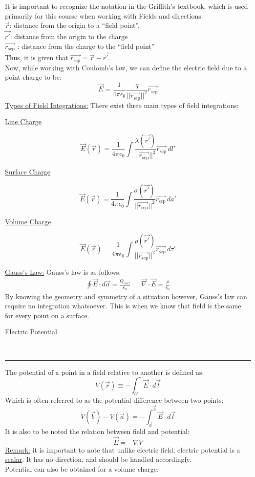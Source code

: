 \documentclass{article}
\newcommand{\sepvec}{\vec{r_\textrm{sep}}}
\newcommand{\header}[1]{\begin{large}\noindent #1\end{large}\\\rule{\textwidth}{0.5pt}}
\newcommand{\gap}{\medskip\\}
\newcommand{\centertext}[1]{\begin{center}#1\end{center}}
\newcommand{\sheader}[1]{\underline{#1:}}
\newcommand{\sgap}{\smallskip\\}
\begin{document}
It is important to recognize the notation in the Griffith's textbook, which is used
primarily for this course when working with Fields and directions:
\sgap
$\vec{r}$: distance from the origin to a ``field point''.\\
$\vec{r'}$: distance from the origin to the charge\\
$\sepvec$ : distance from the charge to the ``field point''\\
Thus, it is given that $\sepvec = \vec{r} - \vec{r'}$.
\gap
Now, while working with Coulomb's law, we can define the electric field due to a point charge to be:
\[
    \vec{E} = \frac{1}{4\pi \epsilon_0} \frac{q}{||\sepvec||^2}\sepvec    
\]
\sheader{Types of Field Integrations} There exist three main types of field integrations:
\begin{multicols}{3}
    \centertext{\underline{Line Charge}}
    \[
        \vec{E}(\vec{r}) = \frac{1}{4 \pi \epsilon_0}\int{\frac{\lambda(\vec{r'})}{||\sepvec||^2}\sepvec \, dl'}    
    \]
    \vfill\null\columnbreak
    \centertext{\underline{Surface Charge}}
    \[
        \vec{E}(\vec{r}) = \frac{1}{4\pi\epsilon_0}\int{\frac{\sigma(\vec{r'})}{||\sepvec||^2}\sepvec \, da'}    
    \]
    \vfill\null\columnbreak
    \centertext{\underline{Volume Charge}}
    \[
        \vec{E}(\vec{r}) = \frac{1}{4\pi\epsilon_0}\int{\frac{\rho(\vec{r'})}{||\sepvec||^2}\sepvec \, d\tau'}    
    \]
    \vfill\null
\end{multicols}
\sheader{Gauss's Law} Gauss's law is as follows:
\begin{align*}
    \oint{\vec{E} \cdot d\vec{a}} = \frac{Q_\textrm{encl}}{\epsilon_0} && \vec{\nabla} \cdot \vec{E} = \frac{\rho}{\epsilon_0}
\end{align*}
By knowing the geometry and symmetry of a situation however, Gauss's law can require
no integration whatsoever. This is when we know that field is the same for every point
on a surface. 
\gap
\header{Electric Potential}
The potential of a point in a field relative to another is defined as:
\[
    V(\vec{r}) \equiv - \int_{\mathcal{O}}^r \vec{E} \cdot d\vec{l}    
\]
Which is often referred to as the potential difference between two points:
\[
    V(\vec{b}) - V(\vec{a}) = - \int_{\vec{a}}^{\vec{b}}{\vec{E} \cdot d\vec{l}}
\]
It is also to be noted the relation between field and potential:
\[
    \vec{E} = - \nabla V    
\]
\sheader{Remark} it is important to note that unlike electric field, electric potential
is a \underline{scalar}. It has no direction, and should be handled accordingly.
\gap
Potential can also be obtained for a volume charge:
\end{document}
